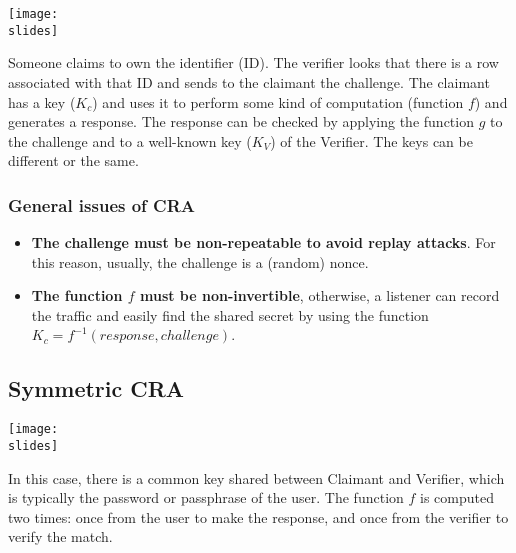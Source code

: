 \vspace{2mm}
\noindent
\begin{minipage}{0.5\textwidth}
  \centering
  \texttt{[image: \\slides]}
\end{minipage}
\hspace{0.05\textwidth}
\begin{minipage}{0.4\textwidth}
  Someone claims to own the identifier (ID). The verifier looks that there is a row
  associated with that ID and sends to the
  claimant the challenge. The claimant has
  a key (\(K_c\)) and uses it to perform some
  kind of computation (function \(f\)) and
  generates a response. The response can
  be checked by applying the function \(g\) to
  the challenge and to a well-known key (\(K_V\)) of the Verifier. The keys can be different or the same.
\end{minipage}


\subsubsection{General issues of CRA}
\begin{itemize}
  \item \textbf{The challenge must be non-repeatable to avoid replay attacks}. For this reason, usually, the challenge
        is a (random) nonce.
  \item \textbf{The function \(f\) must be non-invertible}, otherwise, a listener can record the traffic and easily find the
        shared secret by using the function \(K_c = f^{-1}(response, challenge)\).
\end{itemize}



\subsection{Symmetric CRA}

\noindent
\begin{minipage}{0.5\textwidth}
  \centering
  \texttt{[image: \\slides]}
\end{minipage}
\hspace{0.05\textwidth}
\begin{minipage}{0.4\textwidth}
  In this case, there is a common key
  shared between Claimant and Verifier,
  which is typically the password or
  passphrase of the user. The function \(f\) is computed two times: once from the user
  to make the response, and once from the
  verifier to verify the match.
\end{minipage}

